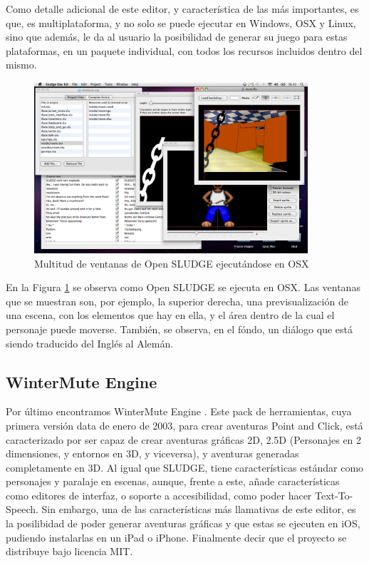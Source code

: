 Como detalle adicional de este editor, y característica de las más importantes, es que, es multiplataforma, y no solo se puede ejecutar en Windows, OSX y Linux, sino que además, le da al usuario la posibilidad de generar su juego para estas plataformas, en un paquete individual, con todos los recursos incluidos dentro del mismo.

\begin{figure}[htb]
	\centerline{\includegraphics[height=2.5in]{figures/sludge.png}}
	\caption[Open SLUDGE]{Multitud de ventanas de Open SLUDGE ejecutándose en OSX}
	\label{sludgefigure}
\end{figure}

En la Figura \ref{sludgefigure} se observa como Open SLUDGE se ejecuta en OSX. Las ventanas que se muestran son, por ejemplo, la superior derecha, una previsualización de una escena, con los elementos que hay en ella, y el área dentro de la cual el personaje puede moverse. También, se observa, en el fóndo, un diálogo que está siendo traducido del Inglés al Alemán.

\subsection{WinterMute Engine}
\label{wintermute}

Por último encontramos WinterMute Engine \cite{wintermuteengine}. Este pack de herramientas, cuya primera versión data de enero de 2003, para crear aventuras Point and Click, está caracterizado por ser capaz de crear aventuras gráficas 2D, 2.5D (Personajes en 2 dimensiones, y entornos en 3D, y viceversa), y aventuras generadas completamente en 3D. Al igual que SLUDGE, tiene características estándar como personajes y paralaje en escenas, aunque, frente a este, añade características como editores de interfaz, o soporte a accesibilidad, como poder hacer Text-To-Speech. Sin embargo, una de las características más llamativas de este editor, es la posilibidad de poder generar aventuras gráficas y que estas se ejecuten en iOS, pudiendo instalarlas en un iPad o iPhone. Finalmente decir que el proyecto se distribuye bajo licencia MIT.

